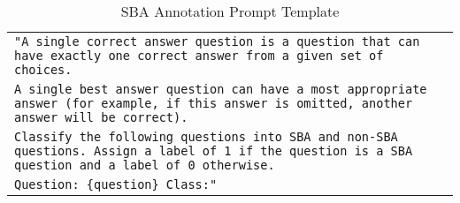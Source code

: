 \begin{table*}[th!]
\centering
\begin{adjustbox}{max width=1.\linewidth}
\begin{tabular}{|l|}
\toprule
\texttt{"A single correct answer question is a question that can have exactly one correct answer from a given set of choices.}\\
\texttt{A single best answer question can have a most appropriate answer (for example, if this answer is omitted, another answer will be correct). 
}\\
\texttt{Classify the following questions into SBA and non-SBA questions. Assign a label of 1 if the question is a SBA question and a label of 0 otherwise.
} \\
\texttt{Question: \{question\}
Class:" 
} \\ \hline
\end{tabular}
\end{adjustbox}
\caption{SBA Annotation Prompt Template}
\label{tab:prompt_template}
\end{table*}

